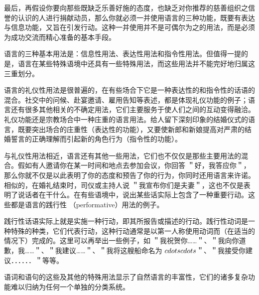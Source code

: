 最后，再假设你要向那些既缺乏乐善好施的态度，也缺乏对你推荐的慈善组织之信誉的认识的人进行捐献动员，那么你就必须一并使用语言的三种功能，既要有表达与信息功能，又旨在引发行动。这种一并使用并不是可偶尔为之的用法，而是必须为成功交流而精心准备的基本手段。

语言的三种基本用法是：信息性用法、表达性用法和指令性用法。但值得一提的是，语言在某些特殊语境中还具有一些特殊用法，而这些用法并不能完好地归属这三重划分。

语言的礼仪性用法是很普遍的，在有些场合下它是一种表达性的和指令性的话语的混合。社交中的问候、赴宴邀请、雇用告知等表述，都是体现礼仪功能的例子；语言还有很多其他相关的不确定用法，它们主要服务于使人们之间的互动变得融洽。礼仪功能还是宗教场合中一种庄重的语言用法。给人留下深刻印象的结婚仪式的语言，既要突出场合的庄重性（表达性的功能），又要使新郎和新娘提高对严肃的结婚誓言的正确理解而引起新的角色行为（指令性的功能）。

与礼仪性用法相近，语言还有其他一些用法，它们也不仅仅是那些主要用法的混合。假如有人邀请你在某一时间和地点去参加会议，你回答 ＂好，我答应你＂，那么你就不仅是以此表明了你的态度和预告了你的行为，你同时还用语言来许诺。相似的，在婚礼结束时，司仪或主持人说 ＂我宣布你们是夫妻＂，这也不仅是表明了说话者在干什么。在有些语境中，说出某些话实际上包含了一种重要行动。这些都是语言的践行性 （performative）用法的例子。

践行性话语实际上就是实施一种行动，即其所报告或描述的行动。践行性动词是一种特殊的种类，它们代表行动，这种行动通常是以第一人称使用动词而（在适当的情况下）完成的。这里可以再举出一些例子，如 ＂我祝贺你……＂、＂我向你道歉，我……＂、＂我建议……＂、＂我将这艘船命名为 $\\cdots \\cdots$＂、＂我接受你建议．．．．．．＂等等。

语词和语句的这些及其他的特殊用法显示了自然语言的丰富性，它们的诸多复杂功能难以归纳为任何一个单独的分类系统。 